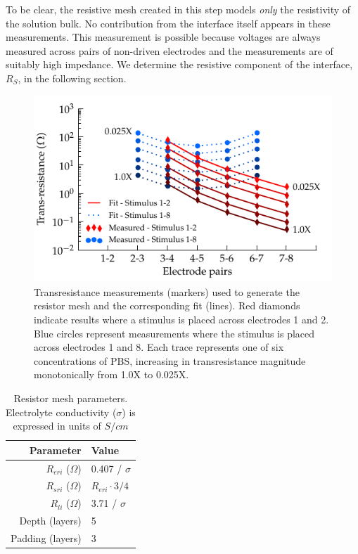\documentclass[journal, a4paper]{IEEEtran}
\begin{document}
To be clear, the resistive mesh created in this step models \textit{only} the resistivity of the solution bulk.
No contribution from the interface itself appears in these measurements.
This measurement is possible because voltages are always measured across pairs of non-driven electrodes and the measurements are of suitably high impedance.
We determine the resistive component of the interface, $R_{S}$, in the following section.

\begin{figure}
    \begin{center}
        \includegraphics{graphics/pbs_transimpedance_IEEE}
    \end{center}
    \caption{Transresistance measurements (markers) used to generate the resistor mesh and the corresponding fit (lines). Red diamonds indicate results where a stimulus is placed across electrodes 1 and 2. Blue circles represent measurements where the stimulus is placed across electrodes 1 and 8. Each trace represents one of six concentrations of PBS, increasing in transresistance magnitude monotonically from 1.0X to 0.025X.}
    \label{fig:transresistance}
\end{figure}


\begin{table}
    \caption{Resistor mesh parameters. Electrolyte conductivity ($\sigma$) is expressed in units of $S / cm$}
    \label{tab:RESparams}
    \begin{center}
        \begin{tabular}{r | l}
            Parameter & Value \\
            \hline
            $R_{eri}$ ($\Omega$)& 0.407 / $\sigma$\\
            $R_{sri}$ ($\Omega$)& $R_{eri}\cdot 3/4$\\
            $R_{li}$ ($\Omega$)& 3.71 / $\sigma$ \\
            Depth (layers) & 5 \\
            Padding (layers) & 3 \\
        \end{tabular}
    \end{center}
\end{table}
\end{document}
